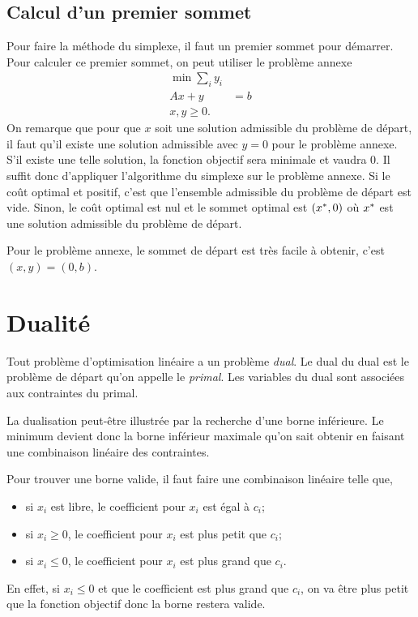 \subsection{Calcul d'un premier sommet}
Pour faire la méthode du simplexe,
il faut un premier sommet pour démarrer.
Pour calculer ce premier sommet,
on peut utiliser le problème annexe
\begin{align*}
  \min \sum_i y_i\\
  Ax + y & = b\\
  x,y \geq 0.
\end{align*}
On remarque que
pour que $x$ soit une solution admissible du problème de départ,
il faut qu'il existe une solution admissible avec $y=0$ pour le problème
annexe.
S'il existe une telle solution, la fonction objectif sera minimale et
vaudra 0.
Il suffit donc d'appliquer l'algorithme du simplexe sur le problème annexe.
Si le coût optimal et positif, c'est que l'ensemble admissible du
problème de départ est vide.
Sinon, le coût optimal est nul et le sommet optimal est $(x^*,0)$
où $x^*$ est une solution admissible du problème de départ.

Pour le problème annexe, le sommet de départ est très facile à obtenir,
c'est $(x,y) = (0,b)$.

\section{Dualité}
Tout problème d'optimisation linéaire a un problème \emph{dual}.
Le dual du dual est le problème de départ qu'on appelle le \emph{primal}.
Les variables du dual sont associées aux contraintes du primal.

La dualisation peut-être illustrée par la recherche d'une borne inférieure.
Le minimum devient donc la borne inférieur maximale qu'on sait
obtenir en faisant une combinaison linéaire des contraintes.

Pour trouver une borne valide, il faut faire une combinaison linéaire
telle que,
\begin{itemize}
  \item si $x_i$ est libre, le coefficient pour $x_i$ est égal à $c_i$;
  \item si $x_i \geq 0$, le coefficient pour $x_i$ est plus petit que $c_i$;
  \item si $x_i \leq 0$, le coefficient pour $x_i$ est plus grand que $c_i$.
\end{itemize}
En effet, si $x_i \leq 0$ et que le coefficient est plus grand que $c_i$,
on va être plus petit que la fonction objectif donc la borne restera valide.

